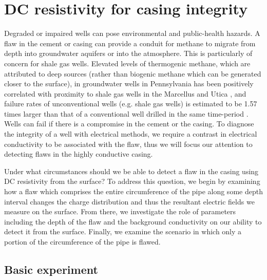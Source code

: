 \section{DC resistivity for casing integrity}
\label{sec:casing_integrity}

Degraded or impaired wells can pose environmental and public-health hazards. A flaw in the cement or casing can provide a conduit for methane to migrate from depth into groundwater aquifers or into the atmosphere. This is particularly of concern for shale gas wells. Elevated levels of thermogenic methane, which are attributed to deep sources (rather than biogenic methane which can be generated closer to the surface), in groundwater wells in Pennsylvania has been positively correlated with proximity to shale gas wells in the Marcellus and Utica \citep{Osborn2011, Jackson2013}, and failure rates of unconventional wells (e.g. shale gas wells) is estimated to be 1.57 times larger than that of a conventional well drilled in the same time-period \citep{Ingraffea2014}. Wells can fail if there is a compromise in the cement or the casing. To diagnose the integrity of a well with electrical methods, we require a contrast in electrical conductivity to be associated with the flaw, thus we will focus our attention to detecting flaws in the highly conductive casing.

Under what circumstances should we be able to detect a flaw in the casing using DC resistivity from the surface? To address this question, we begin by examining how a flaw which comprises the entire circumference of the pipe along some depth interval changes the charge distribution and thus the resultant electric fields we measure on the surface. From there, we investigate the role of parameters including the depth of the flaw and the background conductivity on our ability to detect it from the surface. Finally, we examine the scenario in which only a portion of the circumference of the pipe is flawed.

\subsection{Basic experiment}

